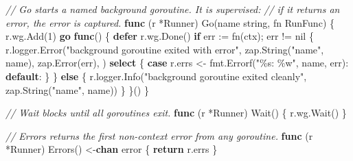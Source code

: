 \documentclass[
]{article}
\newenvironment{Shaded}{}{}
\newcommand{\CommentTok}[1]{\textcolor[rgb]{0.38,0.63,0.69}{\textit{#1}}}
\newcommand{\ControlFlowTok}[1]{\textcolor[rgb]{0.00,0.44,0.13}{\textbf{#1}}}
\newcommand{\DataTypeTok}[1]{\textcolor[rgb]{0.56,0.13,0.00}{#1}}
\newcommand{\DecValTok}[1]{\textcolor[rgb]{0.25,0.63,0.44}{#1}}
\newcommand{\KeywordTok}[1]{\textcolor[rgb]{0.00,0.44,0.13}{\textbf{#1}}}
\newcommand{\NormalTok}[1]{#1}
\newcommand{\OperatorTok}[1]{\textcolor[rgb]{0.40,0.40,0.40}{#1}}
\newcommand{\OtherTok}[1]{\textcolor[rgb]{0.00,0.44,0.13}{#1}}
\newcommand{\StringTok}[1]{\textcolor[rgb]{0.25,0.44,0.63}{#1}}
\begin{document}
\begin{Shaded}
\begin{Highlighting}[]
\CommentTok{// Go starts a named background goroutine. It is supervised:}
\CommentTok{// if it returns an error, the error is captured.}
\KeywordTok{func} \OperatorTok{(}\NormalTok{r }\OperatorTok{*}\NormalTok{Runner}\OperatorTok{)}\NormalTok{ Go}\OperatorTok{(}\NormalTok{name }\DataTypeTok{string}\OperatorTok{,}\NormalTok{ fn RunFunc}\OperatorTok{)} \OperatorTok{\{}
\NormalTok{    r}\OperatorTok{.}\NormalTok{wg}\OperatorTok{.}\NormalTok{Add}\OperatorTok{(}\DecValTok{1}\OperatorTok{)}
    \ControlFlowTok{go} \KeywordTok{func}\OperatorTok{()} \OperatorTok{\{}
        \ControlFlowTok{defer}\NormalTok{ r}\OperatorTok{.}\NormalTok{wg}\OperatorTok{.}\NormalTok{Done}\OperatorTok{()}
        \ControlFlowTok{if}\NormalTok{ err }\OperatorTok{:=}\NormalTok{ fn}\OperatorTok{(}\NormalTok{ctx}\OperatorTok{);}\NormalTok{ err }\OperatorTok{!=} \OtherTok{nil} \OperatorTok{\{}
\NormalTok{            r}\OperatorTok{.}\NormalTok{logger}\OperatorTok{.}\NormalTok{Error}\OperatorTok{(}\StringTok{"background goroutine exited with error"}\OperatorTok{,}
\NormalTok{                zap}\OperatorTok{.}\NormalTok{String}\OperatorTok{(}\StringTok{"name"}\OperatorTok{,}\NormalTok{ name}\OperatorTok{),}
\NormalTok{                zap}\OperatorTok{.}\NormalTok{Error}\OperatorTok{(}\NormalTok{err}\OperatorTok{),}
            \OperatorTok{)}
            \ControlFlowTok{select} \OperatorTok{\{}
            \ControlFlowTok{case}\NormalTok{ r}\OperatorTok{.}\NormalTok{errs }\OperatorTok{\textless{}{-}}\NormalTok{ fmt}\OperatorTok{.}\NormalTok{Errorf}\OperatorTok{(}\StringTok{"\%s: \%w"}\OperatorTok{,}\NormalTok{ name}\OperatorTok{,}\NormalTok{ err}\OperatorTok{):}
            \ControlFlowTok{default}\OperatorTok{:}
            \OperatorTok{\}}
        \OperatorTok{\}} \ControlFlowTok{else} \OperatorTok{\{}
\NormalTok{            r}\OperatorTok{.}\NormalTok{logger}\OperatorTok{.}\NormalTok{Info}\OperatorTok{(}\StringTok{"background goroutine exited cleanly"}\OperatorTok{,}\NormalTok{ zap}\OperatorTok{.}\NormalTok{String}\OperatorTok{(}\StringTok{"name"}\OperatorTok{,}\NormalTok{ name}\OperatorTok{))}
        \OperatorTok{\}}
    \OperatorTok{\}()}
\OperatorTok{\}}

\CommentTok{// Wait blocks until all goroutines exit.}
\KeywordTok{func} \OperatorTok{(}\NormalTok{r }\OperatorTok{*}\NormalTok{Runner}\OperatorTok{)}\NormalTok{ Wait}\OperatorTok{()} \OperatorTok{\{}
\NormalTok{    r}\OperatorTok{.}\NormalTok{wg}\OperatorTok{.}\NormalTok{Wait}\OperatorTok{()}
\OperatorTok{\}}

\CommentTok{// Errors returns the first non{-}context error from any goroutine.}
\KeywordTok{func} \OperatorTok{(}\NormalTok{r }\OperatorTok{*}\NormalTok{Runner}\OperatorTok{)}\NormalTok{ Errors}\OperatorTok{()} \OperatorTok{\textless{}{-}}\KeywordTok{chan} \DataTypeTok{error} \OperatorTok{\{}
    \ControlFlowTok{return}\NormalTok{ r}\OperatorTok{.}\NormalTok{errs}
\OperatorTok{\}}
\end{Highlighting}
\end{Shaded}
\end{document}
